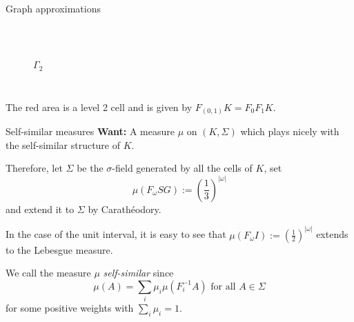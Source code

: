 \begin{frame}{Graph approximations}
\begin{example}
\begin{enumerate}
\begin{columns}[c]
\begin{figure}
\\
                \centering
                \(\Gamma_2 \)
            \end{figure}
        \end{columns}
    \end{enumerate}
    \end{example}
    The red area is a level 2 cell and is given by \(F_{(0,1)}K = F_0 F_1 K\).
\end{frame}

\begin{frame}{Self-similar measures}
    \textbf{Want:} A measure \(\mu \) on \((K, \Sigma) \) which plays nicely with the self-similar structure of \(K \).

    Therefore, let \(\Sigma \) be the \(\sigma \)-field generated by all the cells of \(K \), set
    \[ \mu(F_\omega SG) := \left(\frac{1}{3} \right)^{|\omega |} \]
    and extend it to \(\Sigma \) by Carathéodory.

    In the case of the unit interval, it is easy to see that \( \mu(F_\omega I) := \left( \frac{1}{2} \right)^{|\omega |} \) extends to the Lebesgue measure.

    \begin{definition}
        We call the measure \(\mu \) \textit{self-similar} since
        \[ \mu(A) = \sum_i \mu_i \mu(F_i^{-1} A) \text{ for all } A \in \Sigma \]
        for some positive weights with \(\sum_i \mu_i = 1 \).
    \end{definition}
\end{frame}

